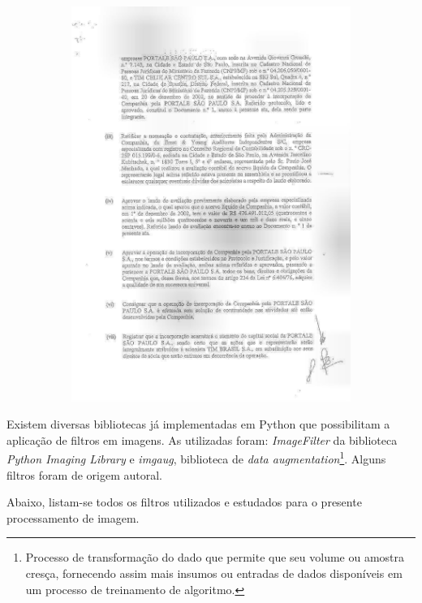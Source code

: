 \begin{figure}[H]
\begin{subfigure}{.5\textwidth}
    \includegraphics[width=0.8\linewidth]{figuras/image-with-overlay.jpg}
    \label{fig:image-with-filter}
  \end{subfigure}
  \label{fig:side-process-images}
\end{figure}

Existem diversas bibliotecas já implementadas em Python que possibilitam a aplicação de filtros em imagens. As utilizadas foram: \textit{ImageFilter} da biblioteca \textit{Python Imaging Library} e \textit{imgaug}, biblioteca de \textit{data augmentation}\footnote{
  Processo de transformação do dado que permite que seu volume ou amostra cresça, fornecendo assim mais insumos ou entradas de dados disponíveis em um processo de treinamento de algoritmo.
}. Alguns filtros foram de origem autoral.

Abaixo, listam-se todos os filtros utilizados e estudados para o presente processamento de imagem.

